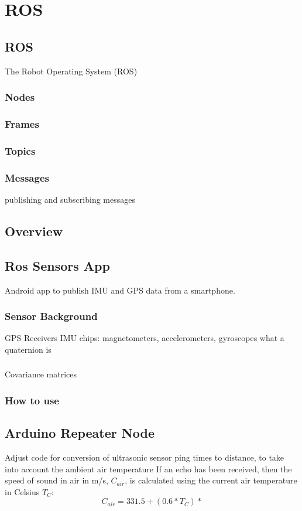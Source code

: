 \chapter{ROS}

\section{ROS}
The Robot Operating System (ROS)


\subsection{Nodes}

\subsection{Frames}

\subsection{Topics}
\subsection{Messages}
publishing and subscribing messages


\section{Overview}

\section{Ros Sensors App}
Android app to publish IMU and GPS data from a smartphone.
\subsection{Sensor Background}
GPS Receivers
IMU chips: magnetometers, accelerometers, gyroscopes
what a quaternion is

\subsection{}
Covariance matrices
\subsection{How to use}

\section{Arduino Repeater Node} \label{RepeaterNode}
Adjust code for conversion of ultrasonic sensor ping times to distance, to take into account the ambient air temperature
If an echo has been received, then the speed of sound in air in m/s, \(C_{air}\), is calculated using the current air temperature in Celsius \(T_C\):
\[C_{air} = 331.5 + (0.6 * T_C)*\]

